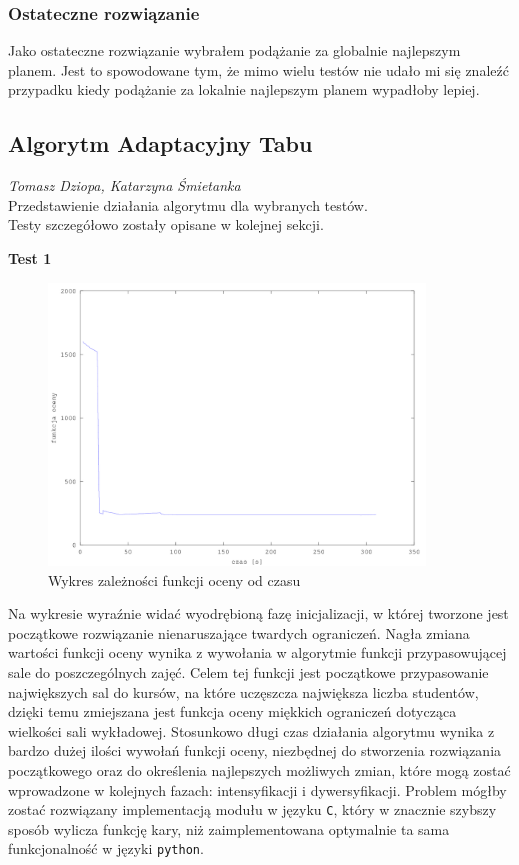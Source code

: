 \subsubsection{Ostateczne rozwiązanie}

\par Jako ostateczne rozwiązanie wybrałem podążanie za globalnie najlepszym planem. Jest to spowodowane tym, że mimo wielu testów nie udało mi się znaleźć przypadku kiedy podążanie za lokalnie najlepszym planem wypadłoby lepiej. 
\subsection{Algorytm Adaptacyjny Tabu}
\textit{Tomasz Dziopa, Katarzyna Śmietanka}\\
Przedstawienie działania algorytmu dla wybranych testów.\\
Testy szczegółowo zostały opisane w kolejnej sekcji.
\par \textbf{Test 1}
\begin{figure}[H]
 
  \centering
    \includegraphics[width=10cm]{ogolny.png}
     \caption{Wykres zależności funkcji oceny od czasu}
\end{figure}
Na wykresie wyraźnie widać wyodrębioną fazę inicjalizacji, w której tworzone jest początkowe rozwiązanie nienaruszające twardych ograniczeń. Nagła zmiana wartości funkcji oceny wynika z wywołania w algorytmie funkcji przypasowującej sale do poszczególnych zajęć. Celem tej funkcji jest początkowe przypasowanie największych sal do kursów, na które uczęszcza największa liczba studentów, dzięki temu zmiejszana jest funkcja oceny miękkich ograniczeń dotycząca wielkości sali wykładowej. Stosunkowo długi czas działania algorytmu wynika z bardzo dużej ilości wywołań funkcji oceny, niezbędnej do stworzenia rozwiązania początkowego oraz do określenia najlepszych możliwych zmian, które mogą zostać wprowadzone w kolejnych fazach: intensyfikacji i dywersyfikacji. Problem mógłby zostać rozwiązany implementacją modułu w języku \verb#C#, który w znacznie szybszy sposób wylicza funkcję kary, niż zaimplementowana optymalnie ta sama funkcjonalność w języki \verb#python#.

